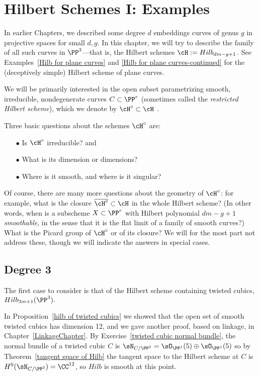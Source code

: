 

\chapter{Hilbert Schemes I: Examples}
\label{HilbertSchemesChapter}

In earlier Chapters, we described some  degree $d$ embeddings curves of  genus $g$ in projective spaces for small $d,g$. In this chapter, we will try to describe the family of all such curves in $\PP^3$---that is, the Hilbert schemes $\cH  := Hilb_{dm-g+1}$.
See Examples~\ref{Hilb for plane curves} and \ref{Hilb for plane curves-continued} for the (deceptively simple) Hilbert scheme of plane curves. 

We will be primarily interested in 
the open subset parametrizing smooth, irreducible, nondegenerate curves $C \subset \PP^r$ (sometimes called the \emph{restricted Hilbert scheme}), which we denote by $\cH^\circ \subset \cH$ . 


Three basic questions about the schemes $\cH^\circ$ are:

\begin{enumerate}
\item[$\bullet$] Is $\cH^\circ$ irreducible? and
\item[$\bullet$]  What is its dimension or dimensions?
\item[$\bullet$] Where is it smooth, and where is it singular?
\end{enumerate}

Of course, there are many more questions about the geometry of $\cH^\circ$: for example,  what is the closure $\overline{\cH^\circ} \subset \cH$ in the whole Hilbert scheme? (In other words, when is a subscheme $X \subset \PP^r$ with Hilbert polynomial $dm-g+1$ \emph{smoothable}, in the sense that it is the flat limit of a family of smooth curves?) What is the Picard group of $\cH^\circ$ or of its closure? We will for the most part not address these, though we will indicate the answers in special cases.


\section{Degree 3}

The first case to consider is that of the Hilbert scheme containing twisted cubics, $Hilb_{3m+1}(\PP^3).$

In Proposition~\ref{hilb of twisted cubics} we showed that the open set of smooth twisted cubics has dimension 12,
and we gave another proof, based on linkage, in Chapter~\ref{LinkageChapter}. 
By Exercise~\ref{twisted cubic normal bundle}, the normal bundle of a twisted cubic $C$ is $\sN_{C/\PP^3}=\sO_{\PP^1}(5)\oplus \sO_{\PP^1}(5)$
so by Theorem~\ref{tangent space of Hilb} the tangent space to the Hilbert scheme at $C$ is
$H^0(\sN_{C/\PP^3}) = \CC^{12}$, so $Hilb$ is smooth at this point.

